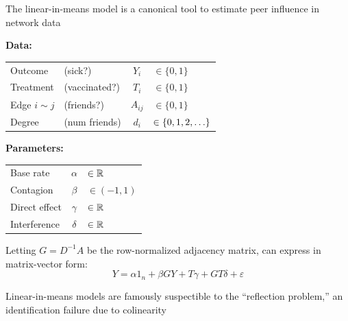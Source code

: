 \documentclass[final]{beamer}
\newlength{\colwidth}
\begin{document}
\begin{frame}[t]
\begin{columns}[t]
\begin{column}{\colwidth}
\begin{block}{The linear-in-means model is a canonical tool to estimate peer influence in network data}
                \begin{minipage}{.5\textwidth}
                    \textbf{Data:}
                    \vspace{3mm}
                    \begin{table}[]
                        \begin{tabular}{llcl}
                            Outcome         & (sick?)       & $Y_i$    & $\in \{0, 1\}$             \\
                            Treatment       & (vaccinated?) & $T_i$    & $\in \{0, 1\}$             \\
                            Edge $i \sim j$ & (friends?)    & $A_{ij}$ & $\in \{0, 1\}$             \\
                            Degree          & (num friends) & $d_i$    & $\in \set{0, 1, 2, \dots}$
                        \end{tabular}
                    \end{table}
                \end{minipage}
                \begin{minipage}{.5\textwidth}
                    \textbf{Parameters:}
                    \vspace{3mm}
                    \begin{table}[]
                        \begin{tabular}{lcl}
                            Base rate     & $\alpha$ & $\in \mathbb{R}$      \\
                            Contagion     & $\beta$  & $\in (-1, 1)$ \\
                            Direct effect & $\gamma$ & $\in \mathbb{R}$      \\
                            Interference  & $\delta$ & $\in \mathbb{R}$
                        \end{tabular}
                    \end{table}
                \end{minipage}

                Letting $G = D^{-1} A$ be the row-normalized adjacency matrix, can express in matrix-vector form:
                \begin{equation*} \label{eq:lim-mv}
                    Y = \alpha 1_n + \beta G Y + T \gamma + G T \delta + \varepsilon
                \end{equation*}
            \end{block}

            \begin{block}{Linear-in-means models are famously suspectible to the ``reflection problem,'' an identification failure due to colinearity}


\end{block}
\end{column}
\end{columns}
\end{frame}
\end{document}
